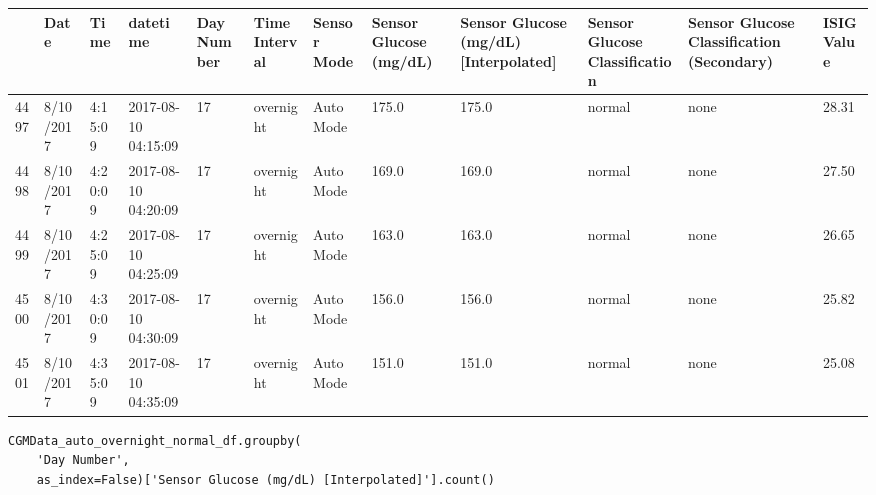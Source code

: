\bigskip\noindent
\begin{tabular}{p{}p{}p{}p{}p{}p{}p{}p{}p{}p{}p{}p{}}
\toprule
 & Date & Time & datetime & Day Number & Time Interval & Sensor Mode & Sensor Glucose (mg/dL) & Sensor Glucose (mg/dL) [Interpolated] & Sensor Glucose Classification & Sensor Glucose Classification (Secondary) & ISIG Value \\
\hline
4497 & 8/10/2017 & 4:15:09 & 2017-08-10 04:15:09 & 17 & overnight & Auto Mode & 175.0 & 175.0 & normal & none & 28.31 \\
\hline
4498 & 8/10/2017 & 4:20:09 & 2017-08-10 04:20:09 & 17 & overnight & Auto Mode & 169.0 & 169.0 & normal & none & 27.50 \\
\hline
4499 & 8/10/2017 & 4:25:09 & 2017-08-10 04:25:09 & 17 & overnight & Auto Mode & 163.0 & 163.0 & normal & none & 26.65 \\
\hline
4500 & 8/10/2017 & 4:30:09 & 2017-08-10 04:30:09 & 17 & overnight & Auto Mode & 156.0 & 156.0 & normal & none & 25.82 \\
\hline
4501 & 8/10/2017 & 4:35:09 & 2017-08-10 04:35:09 & 17 & overnight & Auto Mode & 151.0 & 151.0 & normal & none & 25.08 \\
\hline
\bottomrule
\end{tabular}

\bigskip

\begin{verbatim}
CGMData_auto_overnight_normal_df.groupby(
    'Day Number', 
    as_index=False)['Sensor Glucose (mg/dL) [Interpolated]'].count()
\end{verbatim}

